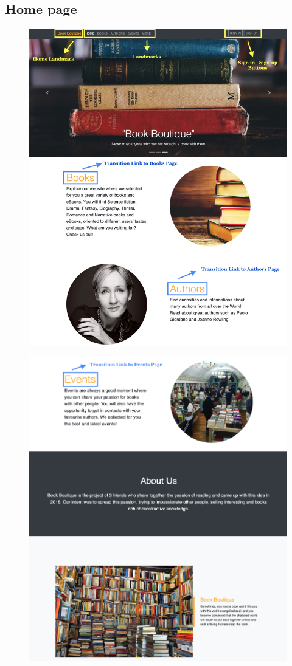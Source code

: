 \documentclass[12pt,a4paper]{article}
\begin{document}
\subsection{Home page}
\begin{figure}[h]
	\centering
	\includegraphics[width=0.9\linewidth]{homescreen1}
	\label{fig:homescreen1}
\end{figure}
\newpage
\begin{figure}[h]
	\centering
	\includegraphics[width=0.9\linewidth]{homescreen2}
	\label{fig:homescreen1}
\end{figure}
\end{document}
